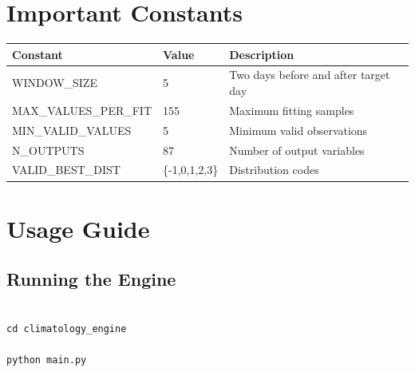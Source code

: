 \documentclass[11pt,a4paper]{article}
\begin{document}
\section{Important Constants}



\begin{table}[h]

\centering

\begin{tabular}{lll}

\toprule

Constant & Value & Description \\

\midrule

WINDOW\_SIZE & 5 &
Two days before and after target day \\


MAX\_VALUES\_PER\_FIT & 155 &
Maximum fitting samples \\


MIN\_VALID\_VALUES & 5 &
Minimum valid observations \\


N\_OUTPUTS & 87 &
Number of output variables \\


VALID\_BEST\_DIST &
\{-1,0,1,2,3\} &
Distribution codes \\


\bottomrule

\end{tabular}

\end{table}



\section{Usage Guide}



\subsection{Running the Engine}



\begin{verbatim}

cd climatology_engine

python main.py

\end{verbatim}
\end{document}
